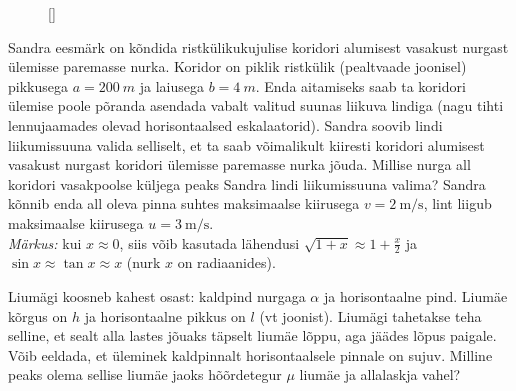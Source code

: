 \documentclass[10pt]{article}
\begin{document}

\begin{figure}
\raisebox{-5pt}[\dimexpr{}\baselineskip\relax]{
}
\end{figure}

Sandra eesmärk on kõndida ristkülikukujulise koridori alumisest vasakust nurgast ülemisse paremasse nurka. Koridor on piklik ristkülik  (pealtvaade joonisel) pikkusega $a = \SI{200}{m}$ ja laiusega $b = \SI{4}{m}$. Enda aitamiseks saab ta koridori ülemise poole põranda asendada vabalt valitud suunas liikuva lindiga (nagu tihti lennujaamades olevad horisontaalsed eskalaatorid). Sandra soovib lindi liikumissuuna valida selliselt, et ta saab võimalikult kiiresti koridori alumisest vasakust nurgast koridori ülemisse paremasse nurka jõuda. Millise nurga all koridori vasakpoolse küljega peaks Sandra lindi liikumissuuna valima? Sandra kõnnib enda all oleva pinna suhtes maksimaalse kiirusega $v = \SI{2}{\meter \per \second}$, lint liigub maksimaalse kiirusega $u = \SI{3}{\meter \per \second}$.\\
\emph{Märkus:} kui $x \approx 0$, siis võib kasutada lähendusi $\sqrt{1+x} \approx 1 + \frac{x}{2}$ ja $\sin{x} \approx \tan{x} \approx x$ (nurk $x$ on radiaanides).
\probend
\bigskip


Liumägi koosneb kahest osast: kaldpind nurgaga $\alpha$ ja horisontaalne pind. Liumäe kõrgus on $h$ ja horisontaalne pikkus on $l$ (vt joonist). Liumägi tahetakse teha selline, et sealt alla lastes jõuaks täpselt liumäe lõppu, aga jäädes lõpus paigale. Võib eeldada, et üleminek kaldpinnalt horisontaalsele pinnale on sujuv. Milline peaks olema sellise liumäe jaoks hõõrdetegur $\mu$ liumäe ja allalaskja vahel?
\begin{figure}[h]
  \vspace{-1.5em}
  \centering
  {
  }
  \vspace{-2em}
\end{figure}
\probend
\bigskip
\end{document}
